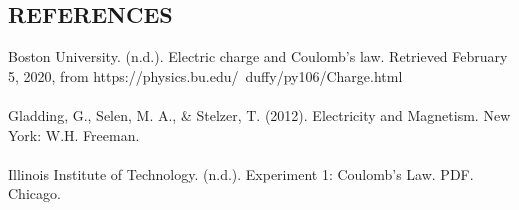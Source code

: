 \documentclass [12pt, letterpaper, twoside] {article}
\begin{document}
\subsection* {REFERENCES}
Boston University. (n.d.). Electric charge and Coulomb's law. Retrieved February 5, 2020, from https://physics.bu.edu/~duffy/py106/Charge.html \\\\
Gladding, G., Selen, M. A., \& Stelzer, T. (2012). Electricity and Magnetism. New York: W.H. Freeman. \\\\
Illinois Institute of Technology. (n.d.). Experiment 1: Coulomb's Law. PDF. Chicago.
\end{document}
